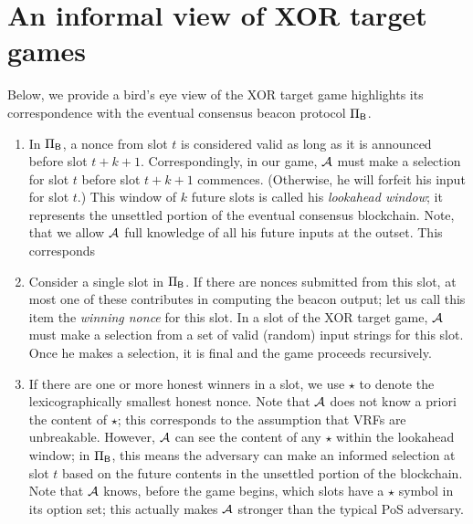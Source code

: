 \section{An informal view of XOR target games}
Below, we provide a bird's eye view of the XOR target game 
highlights its correspondence with the eventual consensus beacon protocol $\Pi_{\mathsf{B}}$. 
\begin{enumerate}    


    \item In $\Pi_{\mathsf{B}}$, a nonce from slot $t$ is considered valid 
    as long as it is announced before slot $t+k+1$. 
    Correspondingly, in our game, $\mathcal{A}$ must make a selection for slot $t$ 
    before slot $t + k + 1$ commences. (Otherwise, he will forfeit his input for slot $t$.) 
    This window of $k$ future slots is called his \emph{lookahead window}; 
    it represents the unsettled portion of the eventual consensus blockchain.
    Note, that we allow $\mathcal{A}$ full knowledge of all his future inputs at the outset. 
    This corresponds 

    \item Consider a single slot in $\Pi_{\mathsf{B}}$. 
    If there are nonces submitted from this slot, 
    at most one of these contributes in computing the beacon output; 
    let us call this item the \emph{winning nonce} for this slot. 
    In a slot of the XOR target game, $\mathcal{A}$ 
    must make a selection from a set of valid (random) input strings for this slot. 
    Once he makes a selection, it is final and the game proceeds recursively.


    \item If there are one or more honest winners in a slot, 
    we use $\star$ to denote the lexicographically smallest honest nonce. 
    Note that $\mathcal{A}$ does not know a priori the content of $\star$; 
    this corresponds to the assumption that VRFs are unbreakable.
    However, $\mathcal{A}$ can see the content of any $\star$ within the lookahead window; 
    in $\Pi_{\mathsf{B}}$, this means the adversary can make an informed selection at slot $t$ 
    based on the future contents in the unsettled portion of the blockchain.
    Note that $\mathcal{A}$ knows, before the game begins, 
    which slots have a $\star$ symbol in its option set; 
    this actually makes $\mathcal{A}$ stronger than the typical PoS adversary.



\end{enumerate}
